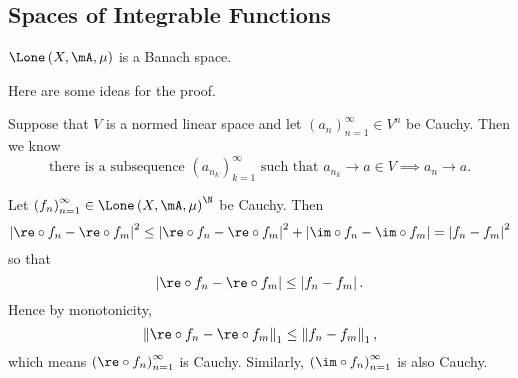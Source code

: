 \documentclass[pmath451]{subfiles}
\begin{document}
    \subsection{Spaces of Integrable Functions}

    \begin{prop}{}
        $\Lone\left( X,\mA,\mu \right)$ is a Banach space.
    \end{prop}

    \rruleline

    \np Here are some ideas for the proof.

    Suppose that $V$ is a normed linear space and let $\left( a_{n} \right)^{\infty}_{n=1}\in V^n$ be Cauchy. Then we know
    \begin{equation*}
        \text{there is a subsequence $\left( a_{n_k} \right)^{\infty}_{k=1}$ such that }a_{n_k}\to a\in V \implies a_n\to a.
    \end{equation*}
    
    Let $\left( f_{n} \right)^{\infty}_{n=1}\in \Lone\left( X,\mA,\mu \right)^{\N}$ be Cauchy. Then
    \begin{equation*}
        \left| \re\circ f_n - \re\circ f_m \right|^{2} \leq \left| \re\circ f_n-\re\circ f_m \right|^{2} + \left| \im\circ f_n-\im\circ f_m \right| = \left| f_n-f_m \right|^{2}
    \end{equation*}
    so that
    \begin{equation*}
        \left| \re\circ f_n-\re\circ f_m \right| \leq \left| f_n-f_m \right|.
    \end{equation*}
    Hence by monotonicity,
    \begin{equation*}
        \left\lVert \re\circ f_n-\re\circ f_m \right\rVert_{1} \leq \left\lVert f_n-f_m \right\rVert_{1},
    \end{equation*}
    which means $\left( \re\circ f_{n} \right)^{\infty}_{n=1}$ is Cauchy. Similarly, $\left( \im\circ f_{n} \right)^{\infty}_{n=1}$ is also Cauchy.
    
\end{document}
